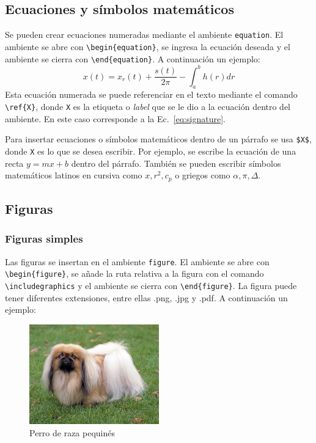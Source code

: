 \subsection{Ecuaciones y símbolos matemáticos}
Se pueden crear ecuaciones numeradas mediante el ambiente \verb!equation!. El ambiente se abre con \verb!\begin{equation}!, se ingresa la ecuación deseada y el ambiente se cierra con \verb!\end{equation}!. A continuación un ejemplo:
\begin{equation}\label{eq:signature}
    x(t) = x_{r}(t) + \frac{s(t)}{2\pi} - \int_{a}^{b} h(r) dr
\end{equation}
Esta ecuación numerada se puede referenciar en el texto mediante el comando \verb!\ref{X}!, donde \verb!X! es la etiqueta o \textit{label} que se le dio a la ecuación dentro del ambiente. En este caso corresponde a la Ec.~\ref{eq:signature}.

Para insertar ecuaciones o símbolos matemáticos dentro de un párrafo se usa \verb!$X$!, donde \verb!X! es lo que se desea escribir. Por ejemplo, se escribe la ecuación de una recta $y = mx + b$ dentro del párrafo. También se pueden escribir símbolos matemáticos latinos en cursiva como $x, r^{2}, c_{p}$ o griegos como $\alpha, \pi, \Delta$.

\subsection{Figuras}
\subsubsection{Figuras simples}
Las figuras se insertan en el ambiente \verb!figure!. El ambiente se abre con \verb!\begin{figure}!, se añade la ruta relativa a la figura con el comando \verb!\includegraphics! y el ambiente se cierra con \verb!\end{figure}!. La figura puede tener diferentes extensiones, entre ellas .png, .jpg y .pdf. A continuación un ejemplo:

\begin{figure}[h]
    \centering    
    \includegraphics[width=0.5\textwidth]{F-Pequines.jpg} 
    \caption{Perro de raza pequinés}
    \label{fig:F-Pequines}
\end{figure}

